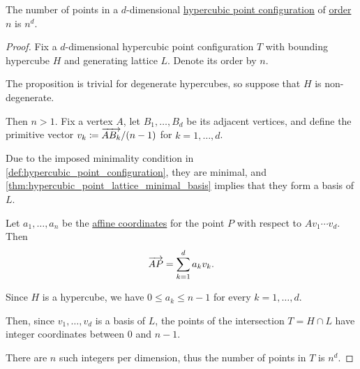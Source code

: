 \begin{proposition}\label{thm:hypercubic_point_configuration_cardinality}
  The number of points in a \( d \)-dimensional \hyperref[def:hypercubic_point_configuration]{hypercubic point configuration} of \hyperref[def:hypercubic_point_configuration_order]{order} \( n \) is \( n^d \).
\end{proposition}
\begin{proof}
  Fix a \( d \)-dimensional hypercubic point configuration \( T \) with bounding hypercube \( H \) and generating lattice \( L \). Denote its order by \( n \).

  The proposition is trivial for degenerate hypercubes, so suppose that \( H \) is non-degenerate.

  Then \( n > 1 \). Fix a vertex \( A \), let \( B_1, \ldots, B_d \) be its adjacent vertices, and define the primitive vector \( v_k \coloneqq \overrightarrow{A B_k} / (n - 1) \) for \( k = 1, \ldots, d \).

  Due to the imposed minimality condition in \cref{def:hypercubic_point_configuration}, they are minimal, and \cref{thm:hypercubic_point_lattice_minimal_basis} implies that they form a basis of \( L \).

  Let \( a_1, \ldots, a_n \) be the \hyperref[def:affine_coordinate_system]{affine coordinates} for the point \( P \) with respect to \( A v_1 \cdots v_d \). Then
  \begin{equation*}
    \overrightarrow{AP} = \sum_{k=1}^d a_k v_k.
  \end{equation*}

  Since \( H \) is a hypercube, we have \( 0 \leq a_k \leq n - 1 \) for every \( k = 1, \ldots, d \).

  Then, since \( v_1, \ldots, v_d \) is a basis of \( L \), the points of the intersection \( T = H \cap L \) have integer coordinates between \( 0 \) and \( n - 1 \).

  There are \( n \) such integers per dimension, thus the number of points in \( T \) is \( n^d \).
\end{proof}

